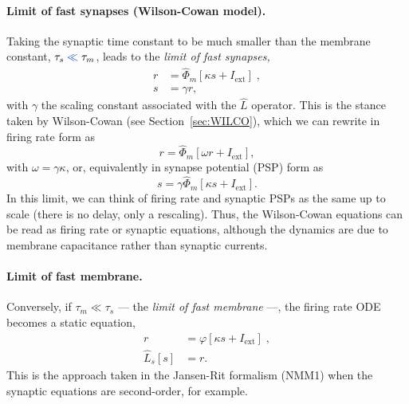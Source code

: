 \documentclass[12pt]{article}
\numberwithin{equation}{section}
\newcommand{\rev}[1]{\begingroup\color{navyblue}#1\endgroup}
\begin{document}
\paragraph{Limit of fast synapses (Wilson-Cowan model).} Taking the synaptic time constant to be much smaller than the membrane constant,  $\tau_s %
\rev{\ll} \tau_m$, leads to the \textit{limit of fast synapses, }
\begin{equation}\label{eq:wilco0}
\begin{aligned}
r &=  \hat \Phi_m [\kappa s +  I_\text{ext}] \;,\\
 s &= \gamma r,
 \end{aligned}
\end{equation}
with $\gamma$ the scaling constant associated with the $\hat L$ operator. This is the stance taken by Wilson-Cowan (see  Section~\ref{sec:WILCO}), which we can rewrite in firing rate form as 
\begin{equation}\label{eq:wilco0-op}
 r =  \hat \Phi_m [\omega r +  I_\text{ext}] ,
\end{equation}
with $\omega= \gamma \kappa$, or, equivalently in synapse potential (PSP) form as
\begin{equation}\label{eq:wilco0-op-s}
 s =  \gamma \hat \Phi_m [\kappa s +  I_\text{ext}].
\end{equation}
In this limit, we can think of firing rate and synaptic PSPs as the same up to scale (there is no delay, only a rescaling). Thus, the Wilson-Cowan equations can be read as firing rate or synaptic equations, although the dynamics are due to membrane capacitance rather than synaptic currents.


 \paragraph{Limit of fast membrane.} Conversely, if \rev{$\tau_m \ll \tau_s$} --- the \textit{limit of fast membrane} ---, the firing rate ODE becomes a static equation,
\begin{equation}
\begin{aligned}
 r  &=  \varphi[\kappa s +  I_\text{ext}] \;,\\
 \hat L_s[s] &=  r.
 \end{aligned}
\end{equation}
This is the approach taken in the Jansen-Rit formalism (NMM1) when the synaptic equations are second-order, for example.
\end{document}
